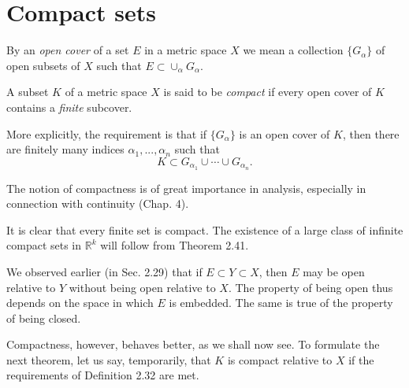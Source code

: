 \section{Compact sets}


\begin{myDef}
    \label{myDef:2.31 open cover}
    By an \emph{open cover} of a set $E$ in a metric space $X$ we mean a collection $\{G_{\alpha}\}$ of open subsets of $X$ such that $E \subset \cup_{\alpha} G_{\alpha}$.
\end{myDef}

\begin{myDef}
    \label{myDef:2.32 compact set}
    A subset $K$ of a metric space $X$ is said to be \emph{compact} if every open cover of $K$ contains a \emph{finite} subcover.
\end{myDef}

More explicitly, the requirement is that if $\{G_{\alpha}\}$ is an open cover of $K$, then there are finitely many indices $\alpha_1, ..., \alpha_n$ such that
\begin{equation*}
    K \subset G_{\alpha_{1}} \cup \cdots \cup G_{\alpha_{n}}.
\end{equation*}

The notion of compactness is of great importance in analysis, especially
in connection with continuity (Chap. 4).

It is clear that every finite set is compact. The existence of a large class of infinite compact sets in $\mathbb{R}^k$ will follow from Theorem 2.41.

We observed earlier (in Sec. 2.29) that if $E \subset Y \subset X$, then $E$ may be open relative to $Y$ without being open relative to $X$. The property of being open thus depends on the space in which $E$ is embedded. The same is true of the property of being closed.

Compactness, however, behaves better, as we shall now see. To formulate the next theorem, let us say, temporarily, that $K$ is compact relative to $X$ if the requirements of Definition 2.32 are met.

